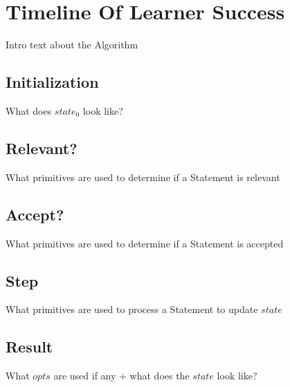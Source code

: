 \documentclass[../main.tex]{subfiles}
\begin{document}
\section{Timeline Of Learner Success}
Intro text about the Algorithm
\subsection{Initialization}
What does $state_{0}$ look like?
\subsection{Relevant?}
What primitives are used to determine if a Statement is relevant
\subsection{Accept?}
What primitives are used to determine if a Statement is accepted
\subsection{Step}
What primitives are used to process a Statement to update $state$
\subsection{Result}
What $opts$ are used if any + what does the $state$ look like?
\end{document}
